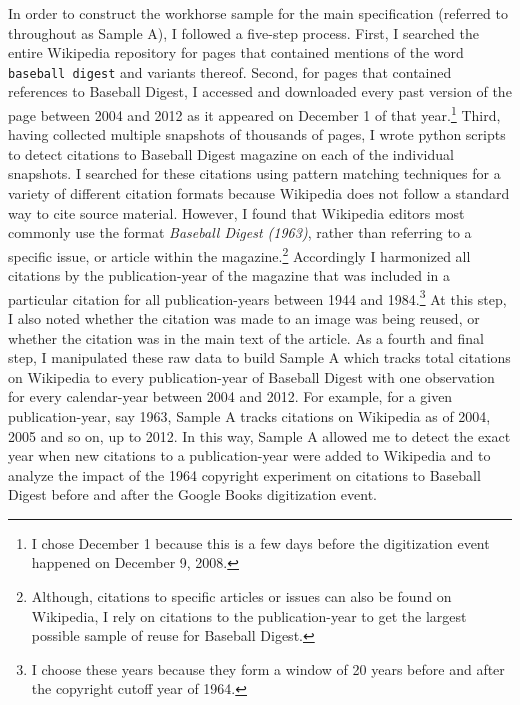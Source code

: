 \documentclass[11pt]{article}
\begin{document}
In order to construct the workhorse sample for the main specification (referred to throughout as Sample A), I followed a five-step process. First, I searched the entire Wikipedia repository for pages that contained mentions of the word \texttt{baseball digest} and variants thereof.  Second, for pages that contained references to Baseball Digest, I accessed and downloaded every past version of the page between 2004 and 2012 as it appeared on December 1 of that year.\footnote{I chose December 1 because this is a few days before the digitization event happened on December 9, 2008.} Third, having collected multiple snapshots of thousands of pages, I wrote python scripts to detect citations to Baseball Digest magazine on each of the individual snapshots. I searched for these citations using pattern matching techniques for a variety of different citation formats because Wikipedia does not follow a standard way to cite source material. However, I found that Wikipedia editors most commonly use the format \emph{Baseball Digest (1963)}, rather than referring to a specific issue, or article within the magazine.\footnote{Although, citations to specific articles or issues can also be found on Wikipedia, I rely on citations to the publication-year to get the largest possible sample of reuse for Baseball Digest.} Accordingly I harmonized all citations by the publication-year of the magazine that was included in a particular citation for all publication-years between 1944 and 1984.\footnote{I choose these years because they form a window of 20 years before and after the copyright cutoff year of 1964.} At this step, I also noted whether the citation was made to an image was being reused, or whether the citation was in the main text of the article. As a fourth and final step, I manipulated these raw data to build Sample A which tracks total citations on Wikipedia to every publication-year of Baseball Digest with one observation for every calendar-year between 2004 and 2012. For example, for a given publication-year, say 1963, Sample A tracks citations on Wikipedia as of 2004, 2005 and so on, up to 2012. In this way, Sample A allowed me to detect the exact year when new citations to a publication-year were added to Wikipedia and to analyze the impact of the 1964 copyright experiment on citations to Baseball Digest before and after the Google Books digitization event. 

\end{document}
